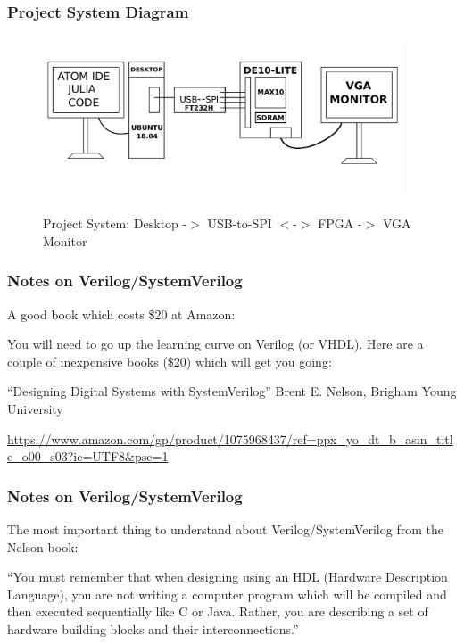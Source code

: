 \documentclass{beamer}
\begin{document}
\begin{frame}
\frametitle{Project System Diagram}

\begin{figure}[h]
	\centering
	\includegraphics[width=0.95\textwidth]{graphics/project_system}
	\centering\bfseries
	\caption{Project System: Desktop -$>$ USB-to-SPI $<$-$>$ FPGA -$>$ VGA Monitor}
\end{figure}

\end{frame}

\begin{frame}
\frametitle{Notes on Verilog/SystemVerilog}

A good book which costs \$20 at Amazon:

You will need to go up the learning curve on Verilog (or VHDL).
Here are a couple of inexpensive books (\$20) which will get you going:

``Designing Digital Systems with SystemVerilog''
Brent E. Nelson, Brigham Young University

\begin{tiny}
	\url{https://www.amazon.com/gp/product/1075968437/ref=ppx_yo_dt_b_asin_title_o00_s03?ie=UTF8&psc=1}
\end{tiny}

\end{frame}

\begin{frame}
\frametitle{Notes on Verilog/SystemVerilog}

The most important thing to understand about Verilog/SystemVerilog from the Nelson book:

``You must remember that when designing using an HDL (Hardware Description Language), you are not writing a computer program which will be compiled and then executed sequentially like C or Java.  Rather, you are describing a set of hardware building blocks and their interconnections.''

\end{frame}
\end{document}
